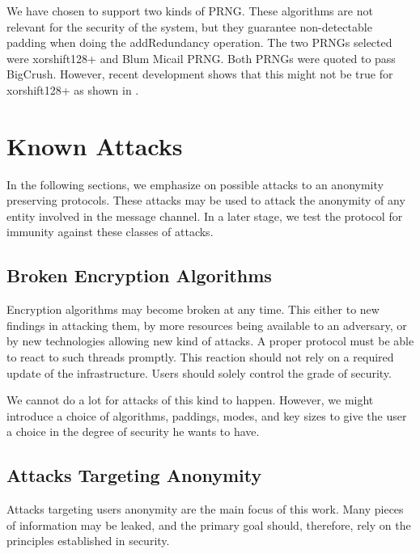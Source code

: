 We have chosen to support two kinds of PRNG. These algorithms are not relevant for the security of the system, but they guarantee non-detectable padding when doing the addRedundancy operation. The two PRNGs selected were xorshift128+ and Blum Micail PRNG. Both PRNGs were quoted to pass BigCrush. However, recent development shows that this might not be true for xorshift128+ as shown in \cite{LEMIRE2019139}.

\section{Known Attacks}
In the following sections, we emphasize on possible attacks to an anonymity preserving protocols. These attacks may be used to attack the anonymity of any entity involved in the message channel. In a later stage, we test the protocol for immunity against these classes of attacks.

\subsection{Broken Encryption Algorithms}
Encryption algorithms may become broken at any time. This either to new findings in attacking them, by more resources being available to an adversary, or by new technologies allowing new kind of attacks. A proper protocol must be able to react to such threads promptly. This reaction should not rely on a required update of the infrastructure. Users should solely control the grade of security. 

We cannot do a lot for attacks of this kind to happen. However, we might introduce a choice of algorithms, paddings, modes, and key sizes to give the user a choice in the degree of security he wants to have.

\subsection{Attacks Targeting Anonymity}
Attacks targeting users anonymity are the main focus of this work. Many pieces of information may be leaked, and the primary goal should, therefore, rely on the principles established in security.

